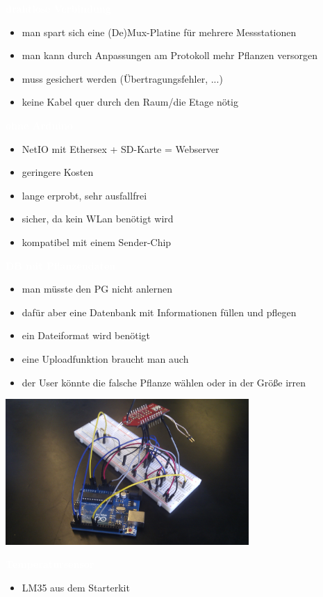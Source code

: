 \documentclass[bigger]{beamer}
\newcommand{\topic}[1]{{\huge{\textcolor{white}{\textbf{#1}}}}}
\begin{document}
\begin{frame}{\topic{drahtlose Verbindung}}
	\begin{itemize}
		\item man spart sich eine (De)Mux-Platine für mehrere Messstationen
		\item man kann durch Anpassungen am Protokoll mehr Pflanzen versorgen
		\item muss gesichert werden (Übertragungsfehler, ...)
		\item keine Kabel quer durch den Raum/die Etage nötig
	\end{itemize}
\end{frame}

\begin{frame}{\topic{ohne Arduino}}
	\begin{itemize}
		\item NetIO mit Ethersex + SD-Karte = Webserver
		\item geringere Kosten
		\item lange erprobt, sehr ausfallfrei
		\item sicher, da kein WLan benötigt wird
		\item kompatibel mit einem Sender-Chip
	\end{itemize}
\end{frame}

\begin{frame}{\topic{DB mit Pflanzendaten}}
	\begin{itemize}
		\item man müsste den PG nicht anlernen
		\item dafür aber eine Datenbank mit Informationen füllen und pflegen
		\item ein Dateiformat wird benötigt
		\item eine Uploadfunktion braucht man auch
		\item der User könnte die falsche Pflanze wählen oder in der Größe irren
	\end{itemize}
\end{frame}



\begin{frame}
\includegraphics[width=350px]{board.jpg}
\end{frame}
\begin{frame}{\topic{Temperatursensor}}
	\begin{itemize}
		\item LM35 aus dem Starterkit
	\end{itemize}
\end{frame}
\end{document}
